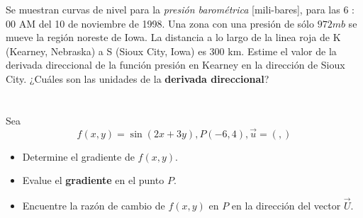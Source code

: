 \documentclass[12pt]{article}
\begin{document}
Se muestran curvas de nivel para la \textit{presión barométrica} [mili-bares], para las 6 : 00 AM del 10 de noviembre de 1998. Una zona con una presión de
sólo $972 mb$ se mueve la región noreste de Iowa. La distancia a lo largo de la linea roja de K (Kearney, Nebraska) a S (Sioux City, Iowa) es 300 km. Estime el valor de la derivada direccional de la función presión en Kearney en la dirección de Sioux City. ¿Cuáles son las unidades de la \textbf{derivada
direccional}?

\section{}

Sea $$f(x, y) = \sin{(2x + 3y)}, P(−6, 4), \vec{u}=\left(,\right)$$

\begin{itemize}[format=\textbf]

\item Determine el gradiente de $f(x, y)$.

\item Evalue el \textbf{gradiente} en el punto $P$.

\item Encuentre la razón de cambio de $f(x, y)$ en $P$ en la dirección del vector $\vec{U}$.

\end{itemize}
\end{document}
